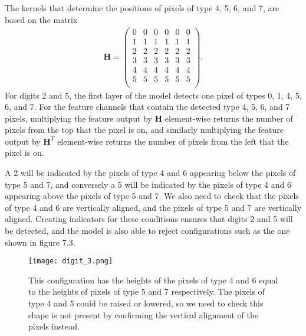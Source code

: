 \documentclass{somasmsc}
\begin{document}
The kernels that determine the positions of pixels of type 4, 5, 6, and 7, are based on the matrix
\begin{align*}
    \mathbf{H} =
    \begin{pmatrix}
        0 & 0 & 0 & 0 & 0 & 0 \\
        1 & 1 & 1 & 1 & 1 & 1 \\
        2 & 2 & 2 & 2 & 2 & 2 \\
        3 & 3 & 3 & 3 & 3 & 3 \\
        4 & 4 & 4 & 4 & 4 & 4 \\
        5 & 5 & 5 & 5 & 5 & 5 \\
    \end{pmatrix}.
\end{align*}
For digits 2 and 5, the first layer of the model detects one pixel of types 0, 1, 4, 5, 6, and 7. For the feature channels that contain the detected type 4, 5, 6, and 7 pixels, multiplying the feature output by $\mathbf{H}$ element-wise returns the number of pixels from the top that the pixel is on, and similarly multiplying the feature output by $\mathbf{H}^T$ element-wise returns the number of pixels from the left that the pixel is on.

A 2 will be indicated by the pixels of type 4 and 6 appearing below the pixels of type 5 and 7, and conversely a 5 will be indicated by the pixels of type 4 and 6 appearing above the pixels of type 5 and 7. We also need to check that the pixels of type 4 and 6 are vertically aligned, and the pixels of type 5 and 7 are vertically aligned. Creating indicators for these conditions ensures that digits 2 and 5 will be detected, and the model is also able to reject configurations such as the one shown in figure 7.3.

\begin{figure}[H]\label{digit:fig3}
\begin{center}
\texttt{[image: digit\_3.png]}
\end{center}
\caption{This configuration has the heights of the pixels of type 4 and 6 equal to the heights of pixels of type 5 and 7 respectively. The pixels of type 4 and 5 could be raised or lowered, so we need to check this shape is not present by confirming the vertical alignment of the pixels instead.}
\end{figure}
\end{document}
